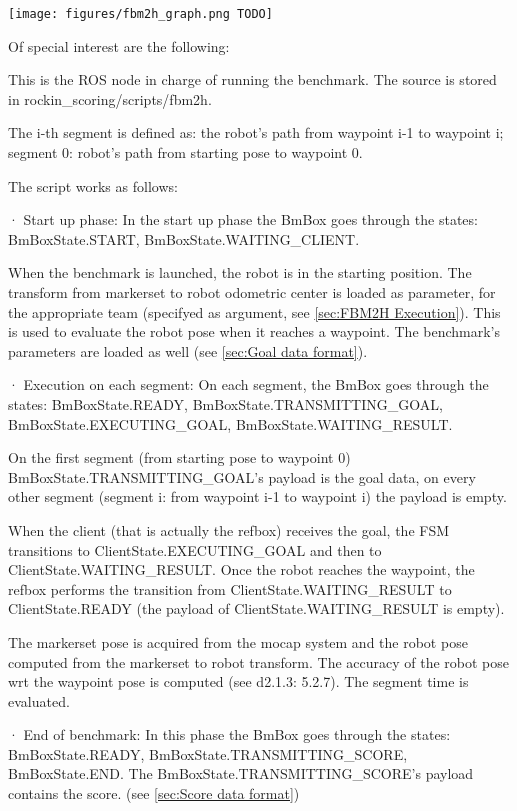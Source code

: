 \documentclass[a4paper]{article}
\begin{document}
\texttt{[image: figures/fbm2h\_graph.png TODO]}

Of special interest are the following:


\label{sec:fbm2h benchmark node}

This is the ROS node in charge of running the benchmark.
The source is stored in rockin_scoring/scripts/fbm2h.

The i-th segment is defined as: the robot's path from waypoint i-1 to waypoint i; segment 0: robot's path from starting pose to waypoint 0.

The script works as follows:

· Start up phase:
In the start up phase the BmBox goes through the states: BmBoxState.START, BmBoxState.WAITING_CLIENT.

When the benchmark is launched, the robot is in the starting position.
The transform from markerset to robot odometric center is loaded as parameter, for the appropriate team (specifyed as argument, see \ref{sec:FBM2H Execution}).
This is used to evaluate the robot pose when it reaches a waypoint.
The benchmark's parameters are loaded as well (see \ref{sec:Goal data format}).

· Execution on each segment:
On each segment, the BmBox goes through the states: BmBoxState.READY, BmBoxState.TRANSMITTING_GOAL, BmBoxState.EXECUTING_GOAL, BmBoxState.WAITING_RESULT.

On the first segment (from starting pose to waypoint 0) BmBoxState.TRANSMITTING_GOAL's payload is the goal data, on every other segment (segment i: from waypoint i-1 to waypoint i) the payload is empty.

When the client (that is actually the refbox) receives the goal, the FSM transitions to ClientState.EXECUTING_GOAL and then to ClientState.WAITING_RESULT.
Once the robot reaches the waypoint, the refbox performs the transition from ClientState.WAITING_RESULT to ClientState.READY (the payload of ClientState.WAITING_RESULT is empty).

The markerset pose is acquired from the mocap system and the robot pose computed from the markerset to robot transform.
The accuracy of the robot pose wrt the waypoint pose is computed (see d2.1.3: 5.2.7).
The segment time is evaluated.

· End of benchmark:
In this phase the BmBox goes through the states: BmBoxState.READY, BmBoxState.TRANSMITTING_SCORE, BmBoxState.END.
The BmBoxState.TRANSMITTING_SCORE's payload contains the score. (see \ref{sec:Score data format})
\end{document}
